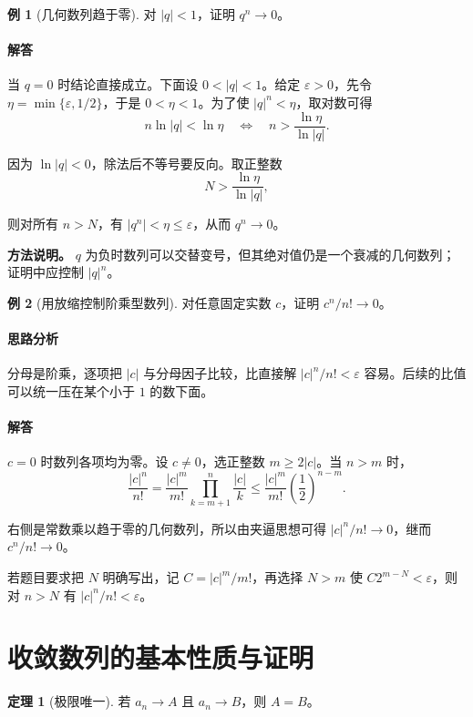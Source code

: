 \documentclass[UTF8,fontset=fandol,12pt,oneside,openany]{ctexrep}
\theoremstyle{definition}
\newtheorem{theorem}{定理}[chapter]
\newtheorem{example}{例}[chapter]
\begin{document}
\begin{example}[几何数列趋于零]
对 $|q|<1$，证明 $q^n\to0$。
\end{example}

\paragraph{解答} 当 $q=0$ 时结论直接成立。下面设 $0<|q|<1$。给定 $\varepsilon>0$，先令 $\eta=\min\{\varepsilon,1/2\}$，于是 $0<\eta<1$。为了使 $|q|^n<\eta$，取对数可得
\[
n\ln|q|<\ln\eta
\quad\Longleftrightarrow\quad
n>\frac{\ln\eta}{\ln|q|}.
\]

因为 $\ln|q|<0$，除法后不等号要反向。取正整数
\[
N>\frac{\ln\eta}{\ln|q|},
\]

则对所有 $n>N$，有 $|q^n|<\eta\le\varepsilon$，从而 $q^n\to0$。

\textbf{方法说明。} $q$ 为负时数列可以交替变号，但其绝对值仍是一个衰减的几何数列；证明中应控制 $|q|^n$。

\begin{example}[用放缩控制阶乘型数列]
对任意固定实数 $c$，证明 $c^n/n!\to0$。
\end{example}

\paragraph{思路分析} 分母是阶乘，逐项把 $|c|$ 与分母因子比较，比直接解 $|c|^n/n!<\varepsilon$ 容易。后续的比值可以统一压在某个小于 $1$ 的数下面。

\paragraph{解答} $c=0$ 时数列各项均为零。设 $c\ne0$，选正整数 $m\ge2|c|$。当 $n>m$ 时，
\[
\frac{|c|^n}{n!}
=\frac{|c|^m}{m!}\prod_{k=m+1}^n\frac{|c|}{k}
\le\frac{|c|^m}{m!}\left(\frac12\right)^{n-m}.
\]

右侧是常数乘以趋于零的几何数列，所以由夹逼思想可得 $|c|^n/n!\to0$，继而 $c^n/n!\to0$。

若题目要求把 $N$ 明确写出，记 $C=|c|^m/m!$，再选择 $N>m$ 使 $C2^{m-N}<\varepsilon$，则对 $n>N$ 有 $|c|^n/n!<\varepsilon$。

\section{收敛数列的基本性质与证明}

\begin{theorem}[极限唯一]
若 $a_n\to A$ 且 $a_n\to B$，则 $A=B$。
\end{theorem}
\end{document}

